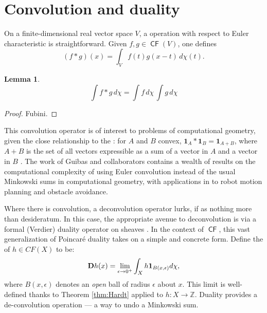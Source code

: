 \documentclass{psapm-l}
\newtheorem{lemma}[theorem]{Lemma}
\theoremstyle{definition}
\theoremstyle{remark}
\numberwithin{equation}{section}
\begin{document}
\section{Convolution and duality}
\label{sec:conv}

On a finite-dimensional real vector space $V$, a {{}} operation with respect to Euler characteristic is straightforward. Given $f,g\in {{{\operatorname{\mathsf{{CF}}}}}}(V)$, one defines
\begin{equation}
\label{eq:conv}
    (f*g)(x) = \int_V f(t)g(x-t)\,d\chi(t) .
\end{equation}

\begin{lemma}
\label{lem:convprod}
\begin{equation}
    \int f*g\,d\chi=\int f\,d\chi\,\int g\,d\chi
\end{equation}
\end{lemma}
\begin{proof}
Fubini.
\end{proof}
This convolution operator is of interest to problems of computational geometry, given the close relationship to the {{}}: for $A$ and $B$ convex, ${{\mathbf{1}}}_A*{{\mathbf{1}}}_B={{\mathbf{1}}}_{A+B}$, where $A+B$ is the set of all vectors expressible as a sum of a vector in $A$ and a vector in $B$ \cite{Viro,Schapira:op,BGRR,Groemer}.
The work of Guibas and collaborators \cite{GRS,Guibas,Ramkumar} contains a wealth of results on the computational complexity of using Euler convolution instead of the usual Minkowski sums in computational geometry, with applications in \cite{Ramkumar} to robot motion planning and obstacle avoidance.

Where there is convolution, a deconvolution operator lurks, if as nothing more than desideratum. In this case, the appropriate avenue to deconvolution is via a formal (Verdier) duality operator on sheaves \cite{Schapira:op}. In the context of ${{{\operatorname{\mathsf{{CF}}}}}}$, this vast generalization of Poincar\'e duality takes on a simple and concrete form. Define the {{}} of $h\in CF(X)$ to be:
\begin{equation}
    {{\bf D}} h(x)
    =
    \lim_{\epsilon\to 0^+}\int_Xh{{\mathbf{1}}}_{B(x,\epsilon)}d\chi ,
\end{equation}
where $B(x,\epsilon)$ denotes an {\em open} ball of radius $\epsilon$ about $x$. This limit is well-defined thanks to Theorem \ref{thm:Hardt} applied to $h\colon X\to{{\mathbb Z}}$. Duality provides a de-convolution operation ---  a way to undo a Minkowski sum.
\end{document}
